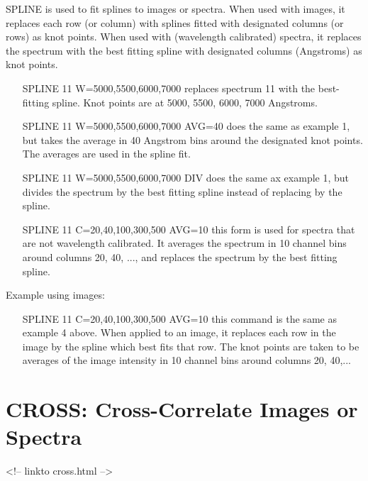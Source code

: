 SPLINE is used to fit splines to images or spectra.  When used with images,
it replaces each row (or column) with splines fitted with designated
columns (or rows) as knot points.  When used with (wavelength calibrated)
spectra, it replaces the spectrum with the best fitting spline with
designated columns (Angstroms) as knot points.

\begin{itemize}
  \item[SPLINE 11 W=5000,5500,6000,7000\hfill]{ replaces spectrum 11 with
       the best-fitting spline.  Knot points are at 5000, 5500, 6000, 7000
       Angstroms.}

  \item[SPLINE 11 W=5000,5500,6000,7000 AVG=40\hfill]{ does the same as
       example 1, but takes the average in 40 Angstrom bins around the
       designated knot points.  The averages are used in the spline fit.}

  \item[SPLINE 11 W=5000,5500,6000,7000 DIV\hfill]{ does the same ax
       example 1, but divides the spectrum by the best fitting spline
       instead of replacing by the spline.}

  \item[SPLINE 11 C=20,40,100,300,500 AVG=10\hfill]{ this form is used for
       spectra that are not wavelength calibrated.  It averages the
       spectrum in 10 channel bins around columns 20, 40, ..., and replaces
       the spectrum by the best fitting spline.}
\end{itemize}


Example using images:

\begin{itemize}
  \item[SPLINE 11 C=20,40,100,300,500 AVG=10\hfill]{ this command is the
       same as example 4 above.  When applied to an image, it replaces each
       row in the image by the spline which best fits that row. The knot
       points are taken to be averages of the image intensity in 10 channel
       bins around columns 20, 40,...}
\end{itemize}

\section{CROSS: Cross-Correlate Images or Spectra}
\begin{rawhtml}
<!-- linkto cross.html -->
\end{rawhtml}

